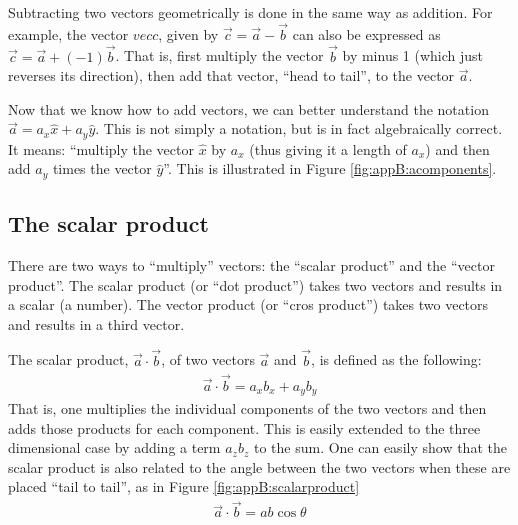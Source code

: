
Subtracting two vectors geometrically is done in the same way as addition. For example, the vector $vec c$, given by $\vec c=\vec a -\vec b$ can also be expressed as $\vec c = \vec a + (-1) \vec b$. That is, first multiply the vector $\vec b$ by minus 1 (which just reverses its direction), then add that vector, ``head to tail'', to the vector $\vec a$. 

Now that we know how to add vectors, we can better understand the notation $\vec a = a_x \hat x+ a_y\hat y$. This is not simply a notation, but is in fact algebraically correct. It means: ``multiply the vector $\hat x$ by $a_x$ (thus giving it a length of $a_x$) and then add $a_y$ times the vector $\hat y$''. This is illustrated in Figure \ref{fig:appB:acomponents}.



\subsection{The scalar product}
There are two ways to ``multiply'' vectors: the ``scalar product'' and the ``vector product''. The scalar product (or ``dot product'') takes two vectors and results in a scalar (a number). The vector product (or ``cros product'') takes two vectors and results in a third vector. 

The scalar product, $\vec a \cdot \vec b$, of two vectors $\vec a$ and $\vec b$, is defined as the following:
\begin{align*}
\vec a \cdot \vec b=a_xb_x +a_yb_y
\end{align*}
That is, one multiplies the individual components of the two vectors and then adds those products for each component. This is easily extended to the three dimensional case by adding a term $a_zb_z$ to the sum. One can easily show that the scalar product is also related to the angle between the two vectors when these are placed ``tail to tail'', as in Figure \ref{fig:appB:scalarproduct}
\begin{align*}
\vec a \cdot \vec b= ab\cos\theta
\end{align*}

